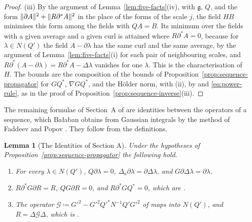 \documentclass[11pt]{preprint}
\DeclarePairedDelimiter{\norm}{\lVert}{\rVert}
\numberwithin{equation}{section}
\newtheorem{lemma}[theorem]{Lemma}
\theoremstyle{definition}
\theoremstyle{remark}
\theoremstyle{plain}
\begin{document}
\begin{proof}
(iii) By the argument of Lemma~\ref{lem:five-facts}(iv), with $\mathfrak g$, $Q$, and the form $\norm{\partial A}^2 + \norm{R\partial^*A}^2$ in the place of the forms of the scale $j$, the field $HB$ minimises this form among the fields with $QA = B$. Its minimum over the fields with a given average and a given curl is attained where $R\partial^*A = 0$, because for $\lambda \in N(Q')$ the field $A - \partial\lambda$ has the same curl and the same average, by the argument of Lemma~\ref{lem:five-facts}(i) for each pair of neighbouring scales, and $R\partial^*(A - \partial\lambda) = R\partial^*A - \Delta\lambda$ vanishes for one $\lambda$. This is the characterisation \cite[(2.5), (2.6), (2.12)]{BalabanPRT2} of $H$. The bounds \cite[(2.151)]{BalabanPRT2} are the composition of the bounds of Proposition~\ref{prop:sequence-propagator} for $GQ^*$, $\nabla GQ^*$, and the H\"older norm, with (ii), by \cite[(2.61)]{BalabanPRT2} and \eqref{eq:power-rule}, as in the proof of Proposition~\ref{prop:sequence-inverse}(iii).
\end{proof}

The remaining formulae of Section~A of \cite{BalabanPRT2} are identities between the operators of a sequence, which Ba{\l}aban obtains from Gaussian integrals by the method of Faddeev and Popov \cite[(2.24)--(2.34)]{BalabanPRT2}. They follow from the definitions.

\begin{lemma}[The Identities of Section A]\label{lem:section-a}
Under the hypotheses of Proposition~\ref{prop:sequence-propagator} the following hold.
\begin{enumerate}[label=(\roman*)]
\item For every $\lambda \in N(Q')$, $Q\partial\lambda = 0$, $\Delta_a\partial\lambda = \partial\Delta\lambda$, and $G\partial\Delta\lambda = \partial\lambda$.
\item $R\partial^*G\partial R = R$, $QG\partial R = 0$, and $R\partial^*GQ^* = 0$, which are \cite[(2.31), (2.34)]{BalabanPRT2}.
\item The operator $\mathscr G \coloneqq G'^2 - G'^2Q'^*N^{-1}Q'G'^2$ of \cite[(2.27)]{BalabanPRT2} maps into $N(Q')$, and $R = \Delta\mathscr G\Delta$, which is \cite[(2.26)]{BalabanPRT2}.
\end{enumerate}
\end{lemma}
\end{document}
